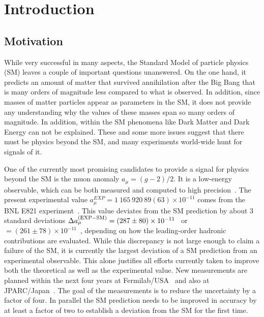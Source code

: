 \section{Introduction}
\subsection{Motivation}
While very successful in many aspects, the Standard Model of particle physics (SM)
leaves a couple of important questions unanswered. On the one hand, it predicts
an amount of matter that survived annihilation after the Big Bang that is many orders
of magnitude less compared to what is observed. In addition, since masses
of matter particles appear as parameters in the SM, it does not provide any understanding
why the values of these masses span so many orders of magnitude.
In addition, within the SM phenomena like Dark Matter and Dark Energy can not be explained.
These and some more 
issues suggest that there must be physics beyond the SM, and many experiments
world-wide hunt for signals of it. 

One of the currently most promising candidates to provide a signal for physics beyond the SM
is the muon anomaly $a_\mu = (g-2)/2$. It is a low-energy observable, which
can be both measured and computed to high precision~\cite{Jegerlehner:2009ry,Blum:2013xva}.  The present experimental
value $a_\mu^{EXP}= 1\ 165\ 920\ 89 (63)\times 10^{-11}$
comes from the BNL E821 experiment~\cite{Bennett:2006fi}.  This value
deviates from the SM prediction by about 3 standard
deviations $\Delta a_\mu^{({\rm EXP-SM})}= (287\pm 80)\times 10^{-11}$~\cite{Davier:2010nc} 
or $= (261\pm 78)\times 10^{-11}$~\cite{Hagiwara:2011af}, depending on how the leading-order
hadronic contributions are evaluated.  While this discrepancy
is not large enough to claim a failure of the SM, it is currently the largest
deviation of a SM prediction from an experimental observable. This
alone justifies all efforts currently taken to improve both the theoretical as well as the experimental value.
New measurements are planned within the next four years at 
Fermilab/USA~\cite{Grange:2015fou} and also at JPARC/Japan~\cite{Saito:2012zz}. The goal
of the measurements is to reduce the uncertainty by a factor of four. 
In parallel the SM prediction needs to be improved in accuracy 
by at least a factor of two to establish a deviation from the SM for the first time.


